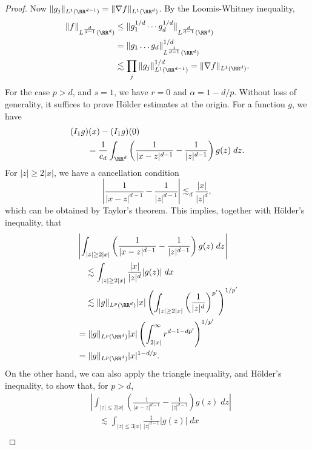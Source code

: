 \begin{proof}
    Now $\| g_j \|_{L^1(\RR^{d-1})} = \| \nabla f \|_{L^1(\RR^d)}$. By the Loomis-Whitney inequality,
    \begin{align*}
        \| f \|_{L^{\frac{d}{d-1}}(\RR^d)} &\leq \| g_1^{1/d} \cdots g_d^{1/d} \|_{L^{ \frac{d}{d-1} }(\RR^d)}\\
        &= \| g_1 \dots g_d \|_{L^{\frac{1}{d-1}}(\RR^d)}^{1/d}\\
        &\lesssim \prod_j \| g_j \|_{L^1(\RR^{d-1})}^{1/d} = \| \nabla f \|_{L^1(\RR^d)}.
    \end{align*}
    For the case $p > d$, and $s = 1$, we have $r = 0$ and $\alpha = 1 - d/p$. Without loss of generality, it suffices to prove H\"{o}lder estimates at the origin. For a function $g$, we have
    \begin{align*}
        &(I_1 g)(x) - (I_1 g)(0)\\
        &\quad\quad = \frac{1}{c_d} \int_{\RR^d} \left( \frac{1}{|x - z|^{d - 1}} - \frac{1}{|z|^{d - 1}} \right) g(z)\; dz.
    \end{align*}
    For $|z| \geq 2 |x|$, we have a cancellation condition
    \[ \left| \frac{1}{|x - z|^{d-1}} - \frac{1}{|z|^{d-1}} \right| \lesssim_d \frac{|x|}{|z|^d}, \]
    which can be obtained by Taylor's theorem. This implies, together with H\"{o}lder's inequality, that
    \begin{align*}
        &\left| \int_{|z| \geq 2 |x|} \left( \frac{1}{|x - z|^{d-1}} - \frac{1}{|z|^{d-1}} \right) g(z)\; dz \right|\\
        &\quad \lesssim \int_{|z| \geq 2 |x|} \frac{|x|}{|z|^d} |g(z)|\; dx\\
        &\quad \lesssim \| g \|_{L^p(\RR^d)} |x| \left( \int_{|z| \geq 2 |x|} \left( \frac{1}{|z|^d} \right)^{p'} \right)^{1/p'}\\
        &= \| g \|_{L^p(\RR^d)} |x| \left( \int_{2 |x|}^\infty r^{d-1 - dp'} \right)^{1/p'}\\
        &= \| g \|_{L^p(\RR^d)} |x|^{1 - d/p}.
    \end{align*}
    On the other hand, we can also apply the triangle inequality, and H\"{o}lder's inequality, to show that, for $p > d$,
    \begin{align*}
        &\left| \int_{|z| \leq 2 |x|} \left( \frac{1}{|x - z|^{d-1}} - \frac{1}{|z|^{d-1}} \right) g(z)\; dz \right|\\
        &\quad \lesssim \int_{|z| \leq 3 |x|} \frac{1}{|z|^{d-1}} |g(z)|\; dx\\

\end{align*}
\end{proof}
